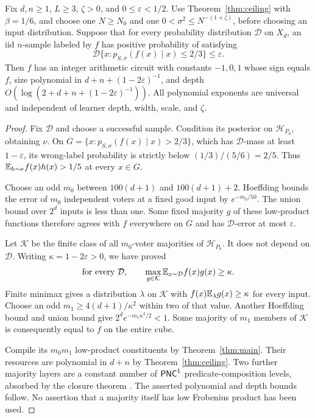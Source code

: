 \begin{theorem}
\label{thm:converse}
Fix $d,n\ge1$, $L\ge3$, $\zeta>0$, and $0\le\varepsilon<1/2$.
Use Theorem~\ref{thm:ceiling} with $\beta=1/6$, and choose one
$N\ge N_0$ and one $0<\sigma^2\le N^{-(1+\zeta)}$, before
choosing an input distribution. Suppose that for every probability
distribution $\mathcal D$ on $X_d$, an iid $n$-sample labeled by $f$
has positive probability of satisfying
\begin{equation}\label{eq:confidence}
 \mathcal D\{x:p_{S,\sigma}(f(x)\mid x)\le2/3\}\le\varepsilon.
\end{equation}
Then $f$ has an integer arithmetic circuit with constants $-1,0,1$
whose sign equals $f$, size polynomial in
$d+n+(1-2\varepsilon)^{-1}$, and depth
$O(\log(2+d+n+(1-2\varepsilon)^{-1}))$.
All polynomial exponents are universal and independent of learner
depth, width, scale, and $\zeta$.
\end{theorem}
\begin{proof}
Fix $\mathcal D$ and choose a successful sample. Condition its
posterior on $\mathcal H_{P_0}$, obtaining $\nu$. On
$G=\{x:p_{S,\sigma}(f(x)\mid x)>2/3\}$, which has
$\mathcal D$-mass at least $1-\varepsilon$, its wrong-label
probability is strictly below $(1/3)/(5/6)=2/5$. Thus
$\mathbb E_{h\sim\nu}f(x)h(x)>1/5$ at every $x\in G$.

Choose an odd $m_0$ between $100(d+1)$ and $100(d+1)+2$.
Hoeffding bounds the error of $m_0$ independent voters at a fixed
good input by $e^{-m_0/50}$. The union bound over $2^d$ inputs is
less than one. Some fixed majority $g$ of these low-product functions
therefore agrees with $f$ everywhere on $G$ and has
$\mathcal D$-error at most $\varepsilon$.

Let $\mathcal K$ be the finite class of all $m_0$-voter majorities
of $\mathcal H_{P_0}$. It does not depend on $\mathcal D$.
Writing $\kappa=1-2\varepsilon>0$, we have proved
\[
 \text{for every }\mathcal D,\qquad
 \max_{g\in\mathcal K}\mathbb E_{x\sim\mathcal D}f(x)g(x)\ge\kappa.
\]
Finite minimax gives a distribution $\lambda$ on $\mathcal K$
with $f(x)\mathbb E_\lambda g(x)\ge\kappa$ for every input. Choose
an odd $m_1\ge4(d+1)/\kappa^2$ within two of that value.
Another Hoeffding bound and union bound give
$2^d e^{-m_1\kappa^2/2}<1$. Some majority of $m_1$ members of
$\mathcal K$ is consequently equal to $f$ on the entire cube.

Compile its $m_0m_1$ low-product constituents by
Theorem~\ref{thm:main}. Their resources are polynomial in $d+n$
by Theorem~\ref{thm:ceiling}. Two further majority layers are a
constant number of $\mathsf{PNC}^1$ predicate-composition levels, absorbed
by the closure theorem \cite{datta}. The asserted polynomial and
depth bounds follow. No assertion that a majority itself has low
Frobenius product has been used.
\end{proof}

